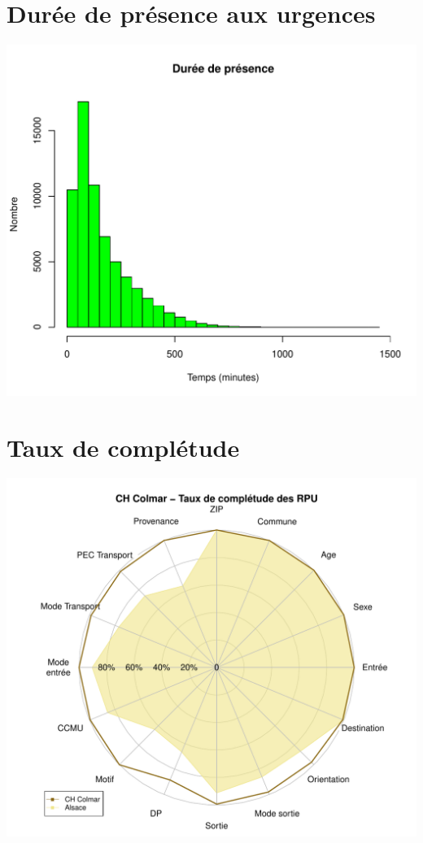 \documentclass[12pt,english,french,twoside]{book}\usepackage[]{graphicx}\usepackage[]{color}
\makeatletter
\def\maxwidth{ %
  \ifdim\Gin@nat@width>\linewidth
    \linewidth
  \else
    \Gin@nat@width
  \fi
}
\newenvironment{knitrout}{}{} %
\makeatother
\begin{document}
\section*{Durée de présence aux urgences}
\begin{knitrout}
\color{fgcolor}
\includegraphics[width=\maxwidth]{figure/graphe_p_col-1} 

\end{knitrout}


\section*{Taux de complétude}

\begin{knitrout}
\color{fgcolor}
\includegraphics[width=\maxwidth]{figure/compl_col-1} 

\end{knitrout}
\end{document}
